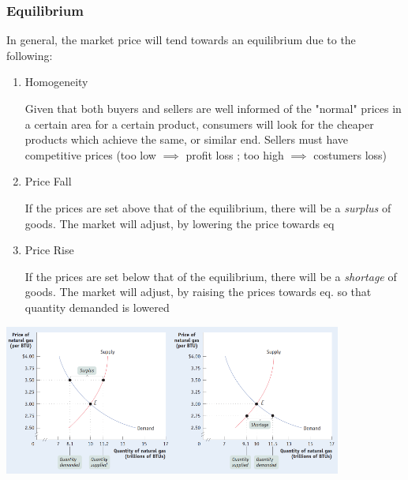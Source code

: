 \documentclass[english,course, draft]{Notes}
\newcommand{\ita}[1]{\textit{#1}}
\begin{document}
\subsubsection{Equilibrium}




\par{In general, the market price will tend towards an equilibrium due to the following:}

\begin{enumerate}

\item Homogeneity

	\par{Given that both buyers and sellers are well informed of the "normal" prices in a certain area for a certain product, consumers will look for the cheaper products which achieve the same, or similar end. Sellers must have competitive prices (too low $\implies$ profit loss ; too high $\implies$ costumers loss)}
	
\item Price Fall

	\par{If the prices are set above that of the equilibrium, there will be a \ita{surplus} of goods. The market will adjust, by lowering the price towards eq}
	
	
\item Price Rise

	\par{If the prices are set below that of the equilibrium, there will be a \ita{shortage} of goods. The market will adjust, by raising the prices towards eq. so that quantity demanded is lowered}
	
\end{enumerate}


\includegraphics[width=15em]{supplySurplus}\includegraphics[width=15em]{supplyShortage}
\end{document}
